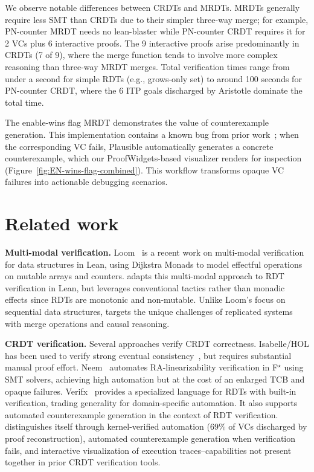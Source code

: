 \documentclass[sigplan,twocolumn,accept]{acmart}
\newcommand{\fstar}{F$^{\star}$\xspace}
\begin{document}
We observe notable differences between CRDTs and MRDTs. MRDTs generally require less SMT than CRDTs due to their simpler three-way merge; for example, PN-counter MRDT needs no lean-blaster while PN-counter CRDT requires it for 2 VCs plus 6 interactive proofs. The 9 interactive proofs arise predominantly in CRDTs (7 of 9), where the merge function tends to involve more complex reasoning than three-way MRDT merges. Total verification times range from under a second for simple RDTs (e.g., grows-only set) to around 100 seconds for PN-counter CRDT, where the 6 ITP goals discharged by Aristotle dominate the total time.

The enable-wins flag MRDT demonstrates the value of counterexample generation. This implementation contains a known bug from prior work~\cite{Neem}; when the corresponding VC fails, Plausible automatically generates a concrete counterexample, which our ProofWidgets-based visualizer renders for inspection (Figure~\ref{fig:EN-wins-flag-combined}). This workflow transforms opaque VC failures into actionable debugging scenarios.

\section{Related work}

\textbf{Multi-modal verification.} Loom~\cite{loom_paper} is a recent work on multi-modal verification for data structures in Lean, using Dijkstra Monads to model effectful operations on mutable arrays and counters. \sal adapts this multi-modal approach to RDT verification in Lean, but leverages conventional tactics rather than monadic effects since RDTs are monotonic and non-mutable. Unlike Loom's focus on sequential data structures, \sal targets the unique challenges of replicated systems with merge operations and causal reasoning.

\textbf{CRDT verification.} Several approaches verify CRDT correctness. Isabelle/HOL has been used to verify strong eventual consistency~\cite{isabelle_verification}, but requires substantial manual proof effort. Neem~\cite{Neem} automates RA-linearizability verification in \fstar using SMT solvers, achieving high automation but at the cost of an enlarged TCB and opaque failures. Verifx~\cite{verifx_paper} provides a specialized language for RDTs with built-in verification, trading generality for domain-specific automation. It also supports automated counterexample generation in the context of RDT verification. \sal distinguishes itself through kernel-verified automation (69\% of VCs discharged by proof reconstruction), automated counterexample generation when verification fails, and interactive visualization of execution traces--capabilities not present together in prior CRDT verification tools.
\end{document}
